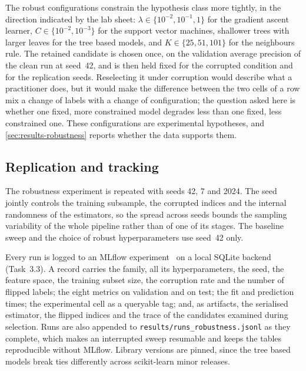 The robust configurations constrain the hypothesis class more tightly, in the
direction indicated by the lab sheet: $\lambda \in \{10^{-2},10^{-1},1\}$ for
the gradient ascent learner, $C \in \{10^{-2},10^{-3}\}$ for the support vector
machines, shallower trees with larger leaves for the tree based models, and
$K \in \{25,51,101\}$ for the neighbours rule. The retained candidate is chosen
once, on the validation average precision of the clean run at seed~\num{42}, and
is then held fixed for the corrupted condition and for the replication seeds.
Reselecting it under corruption would describe what a practitioner does, but it
would make the difference between the two cells of a row mix a change of labels
with a change of configuration; the question asked here is whether one fixed,
more constrained model degrades less than one fixed, less constrained one. These
configurations are experimental hypotheses, and \cref{sec:results-robustness}
reports whether the data supports them.

\subsection{Replication and tracking}
\label{sec:protocol-mlops}

The robustness experiment is repeated with seeds \num{42}, \num{7} and
\num{2024}. The seed jointly controls the training subsample, the corrupted
indices and the internal randomness of the estimators, so the spread across
seeds bounds the sampling variability of the whole pipeline rather than of one
of its stages. The baseline sweep and the choice of robust hyperparameters use
seed~\num{42} only.

Every run is logged to an MLflow experiment~\cite{zaharia2018accelerating} on a
local SQLite backend (Task~3.3). A record carries the family, all its
hyperparameters, the seed, the feature space, the training subset size, the
corruption rate and the number of flipped labels; the eight metrics on
validation and on test; the fit and prediction times; the experimental cell as a
queryable tag; and, as artifacts, the serialised estimator, the flipped indices
and the trace of the candidates examined during selection. Runs are also
appended to \texttt{results/runs\_robustness.jsonl} as they complete, which
makes an interrupted sweep resumable and keeps the tables reproducible without
MLflow. Library versions are pinned, since the tree based models break ties
differently across scikit-learn minor releases.
